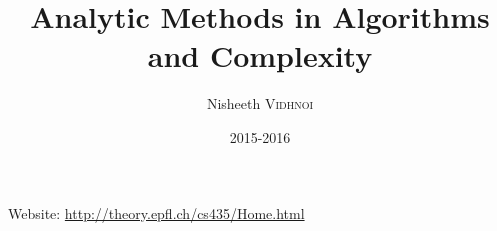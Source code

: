

\title{Analytic Methods in Algorithms and Complexity}
\author{Nisheeth \textsc{Vidhnoi}}
\date{2015-2016}


\maketitle
\tableofcontents

\newpage

Website: \url{http://theory.epfl.ch/cs435/Home.html}




\nocite{*}







